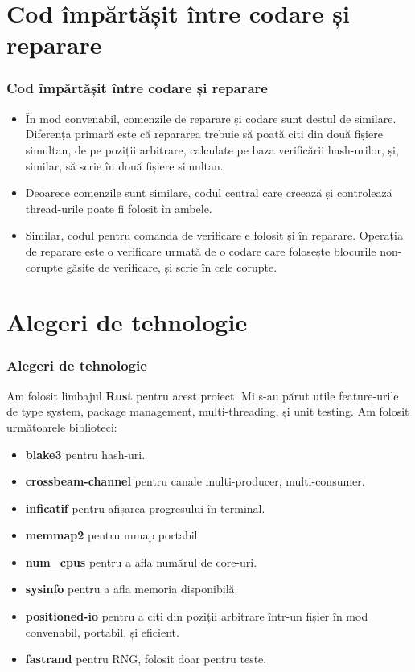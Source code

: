 \documentclass{beamer}
\begin{document}
\section{Cod împărtășit între codare și reparare}

\begin{frame}
\frametitle{Cod împărtășit între codare și reparare}

\begin{itemize}

\item
În mod convenabil, comenzile de reparare și codare sunt destul de similare.
Diferența primară este că repararea trebuie să poată citi din două fișiere simultan,
de pe poziții arbitrare, calculate pe baza verificării hash-urilor,
și, similar, să scrie în două fișiere simultan.

\item
Deoarece comenzile sunt similare, codul central care creează și controlează thread-urile poate fi folosit în ambele.

\item
Similar, codul pentru comanda de verificare e folosit și în reparare.
Operația de reparare este o verificare urmată de o codare care folosește blocurile non-corupte găsite de verificare,
și scrie în cele corupte.

\end{itemize}
\end{frame}

\section{Alegeri de tehnologie}
\begin{frame}
\frametitle{Alegeri de tehnologie}
Am folosit limbajul \textbf{Rust} pentru acest proiect.
Mi s-au părut utile feature-urile de type system, package management, multi-threading, și unit testing.
Am folosit următoarele biblioteci:

\begin{itemize}
\item
\textbf{blake3} pentru hash-uri.
\item
\textbf{crossbeam-channel} pentru canale multi-producer, multi-consumer.
\item
\textbf{inficatif} pentru afișarea progresului în terminal.
\item
\textbf{memmap2} pentru mmap portabil.
\item
\textbf{num\_cpus} pentru a afla numărul de core-uri.
\item
\textbf{sysinfo} pentru a afla memoria disponibilă.
\item
\textbf{positioned-io} pentru a citi din poziții arbitrare într-un fișier în mod convenabil, portabil, și eficient.
\item
\textbf{fastrand} pentru RNG, folosit doar pentru teste.

\end{itemize}
\end{frame}
\end{document}

